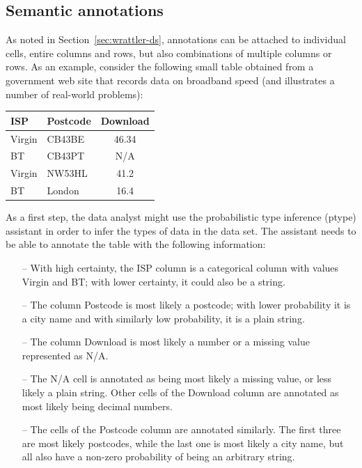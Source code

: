 \documentclass[sigplan,preprint,10pt]{acmart}\settopmatter{printfolios=true,printccs=false,printacmref=false}
\theoremstyle{plain}
\theoremstyle{definition}
\begin{document}
\subsection{Semantic annotations}
As noted in Section~\ref{sec:wrattler-ds}, annotations can be attached to individual cells, 
entire columns and rows, but also combinations of multiple columns or rows. As an example,
consider the following small table obtained from a government web site that records data 
on broadband speed (and illustrates a number of real-world problems):

\vspace{1em}
\begin{tabular}{llc}
\toprule
\textbf{ISP}\qquad\qquad\qquad & \textbf{Postcode}\qquad\qquad & \textbf{Download} \\
\midrule
Virgin & CB43BE & 46.34 \\
BT & CB43PT & N/A \\
Virgin & NW53HL & 41.2 \\
BT & London & 16.4 \\
\bottomrule
\end{tabular}
\vspace{1em}

\noindent
As a first step, the data analyst might use the probabilistic type inference (ptype) assistant
in order to infer the types of data in the data set. The assistant needs to be able to annotate
the table with the following information:
%
\begin{itemize}
\item[--] With high certainty, the ISP column is a categorical column with values Virgin and BT;
  with lower certainty, it could also be a string.
\item[--] The column Postcode is most likely a postcode; with lower probability it is a city name
  and with similarly low probability, it is a plain string.
\item[--] The column Download is most likely a number or a missing value represented as N/A.  
\item[--] The N/A cell is annotated as being most likely a missing value, or less likely a plain 
  string. Other cells of the Download column are annotated as most likely being decimal numbers.
\item[--] The cells of the Postcode column are annotated similarly. The first three are most
  likely postcodes, while the last one is most likely a city name, but all also have a non-zero
  probability of being an arbitrary string.
\end{itemize}
\end{document}
